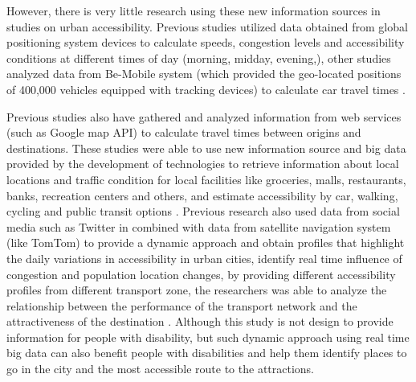 However, there is very little research using these new information sources in studies on urban accessibility. Previous studies utilized data obtained from global positioning system devices to calculate speeds, congestion levels and accessibility conditions at  different times of day (morning, midday, evening,), other studies analyzed data from Be-Mobile system (which provided the geo-located positions of 400,000 vehicles equipped with tracking devices) to calculate car travel times \cite{moya2016dynamic}. 

Previous studies also have gathered and analyzed information from web services (such as Google map API) to calculate travel times between origins and destinations. These studies were able to use new information source and big data provided by the development of technologies to retrieve information about local locations and traffic condition for local facilities like groceries, malls, restaurants, banks, recreation centers and others, and estimate accessibility by car, walking, cycling and public transit options \cite{moya2016dynamic}. Previous research also used data from social media such as Twitter in combined with data from satellite navigation system (like TomTom) to provide a dynamic approach and obtain profiles that highlight the daily variations in accessibility in urban cities, identify real time influence of congestion and population location changes, by providing different accessibility profiles from different transport zone, the researchers was able to analyze the relationship between the performance of the transport network and the attractiveness of the destination \cite{moya2016dynamic}. Although this study is not design to provide information for people with disability, but such dynamic approach using real time big data can also benefit people with disabilities and help them identify places to go in the city and the most accessible route to the attractions. 


